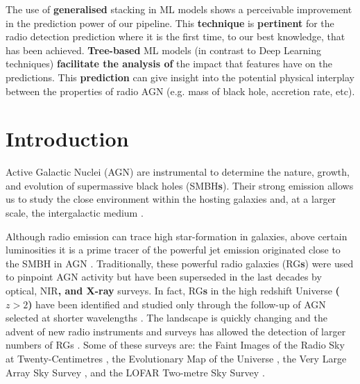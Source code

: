 \documentclass{aa}
\begin{document}
   {The use of \textbf{generalised} stacking in ML models shows a perceivable improvement in the prediction power of our pipeline. This \textbf{technique} is \textbf{pertinent} for the radio detection prediction where it is the first time, to our best knowledge, that has been achieved. \textbf{Tree-based} ML models (in contrast to Deep Learning techniques) \textbf{facilitate the analysis of} the impact that features have on the predictions. This \textbf{prediction} can give insight into the potential physical interplay between the properties of radio AGN (e.g. mass of black hole, accretion rate, etc).}


   \maketitle
%

\section{Introduction}\label{sec:introduction}

Active Galactic Nuclei (AGN) are instrumental to determine the nature, growth, and evolution of supermassive black holes (SMBH\textbf{s}). Their strong emission allows us to study the close environment within the hosting galaxies and, at a larger scale, the intergalactic medium \citep[e.g.][]{2017A&ARv..25....2P, 2022MNRAS.516.5775B}.

Although radio emission can trace high star-formation in galaxies, above certain luminosities \citep[e.g. $\mathrm{log}L_{1.4\mathrm{GHz}} {>} 25\,\mathrm{W\, Hz^{-1}}$,][]{2021MNRAS.503.1780J} it is a prime tracer of the powerful jet emission originated  close to the SMBH in AGN \citep[Radio Galaxies,][]{2014ARA&A..52..589H}. Traditionally, these powerful radio galaxies (RG\textbf{s}) were used to pinpoint AGN activity but have been superseded in the last decades by optical, NIR\textbf{, and X-ray} surveys. In fact, RG\textbf{s} in the high redshift Universe \textbf{($z > 2$)} have been identified and studied only through the follow-up of AGN selected at shorter wavelengths \citep[optical, NIR, millimetre, and X-rays, e.g.][]{2006ApJ...652..157M, 2020A&A...637A..84P, 2021MNRAS.501.3833D}.
The landscape is quickly changing and the advent of new radio instruments and surveys has allowed the detection of larger numbers of RGs \citep[e.g.][]{2018MNRAS.475.3429W, 2020A&A...642A.107C}. Some of these surveys are: the Faint Images of the Radio Sky at Twenty-Centimetres \citep[FIRST;][]{2015ApJ...801...26H}, the Evolutionary Map of the Universe \citep[EMU;][]{2011PASA...28..215N}, the Very Large Array Sky Survey \citep[VLASS;][]{2020RNAAS...4..175G}, and the LOFAR Two-metre Sky Survey \citep[LoTSS;][]{2019A&A...622A...1S}. 
\end{document}
